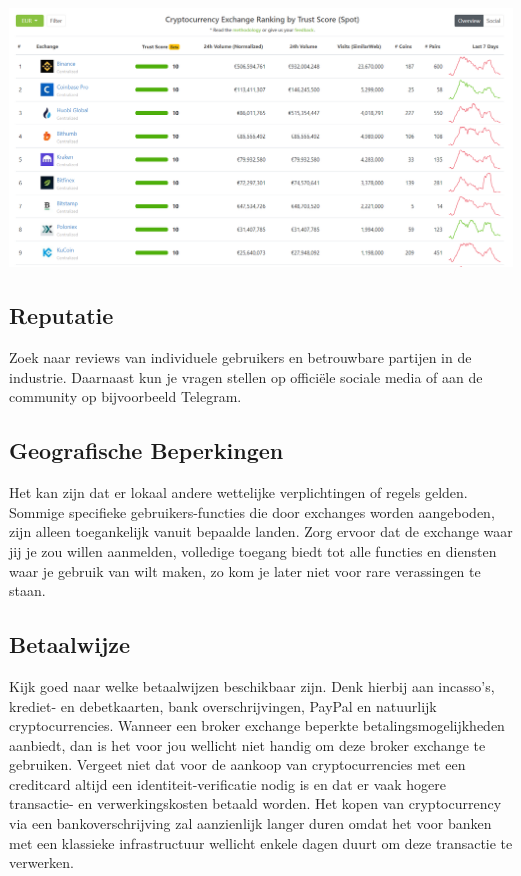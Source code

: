 \medskip 
\begin{borderbox}
    \includegraphics[width=\textwidth]{img/ch-exchanges/exchange-ranking.png}
\end{borderbox}
\medskip

\subsection*{Reputatie} Zoek naar reviews van individuele gebruikers en betrouwbare partijen in de industrie. Daarnaast kun je vragen stellen op offici{\"e}le sociale media of aan de community op bijvoorbeeld Telegram.

\subsection*{Geografische Beperkingen}  Het kan zijn dat er lokaal andere wettelijke verplichtingen of regels gelden. Sommige specifieke gebruikers-functies die door exchanges worden aangeboden, zijn alleen toegankelijk vanuit bepaalde landen. Zorg ervoor dat de exchange waar jij je zou willen aanmelden, volledige toegang biedt tot alle functies en diensten waar je gebruik van wilt maken, zo kom je later niet voor rare verassingen te staan. 

\subsection*{Betaalwijze} Kijk goed naar welke betaalwijzen beschikbaar zijn. Denk hierbij aan incasso's, krediet- en debetkaarten, bank overschrijvingen, PayPal en natuurlijk cryptocurrencies. Wanneer een broker exchange beperkte betalingsmogelijkheden aanbiedt, dan is het voor jou wellicht niet handig om deze broker exchange te gebruiken. Vergeet niet dat voor de aankoop van cryptocurrencies met een creditcard altijd een identiteit-verificatie nodig is en dat er vaak hogere transactie- en verwerkingskosten betaald worden. Het kopen van cryptocurrency via een bankoverschrijving zal aanzienlijk langer duren omdat het voor banken met een klassieke infrastructuur wellicht enkele dagen duurt om deze transactie te verwerken.

